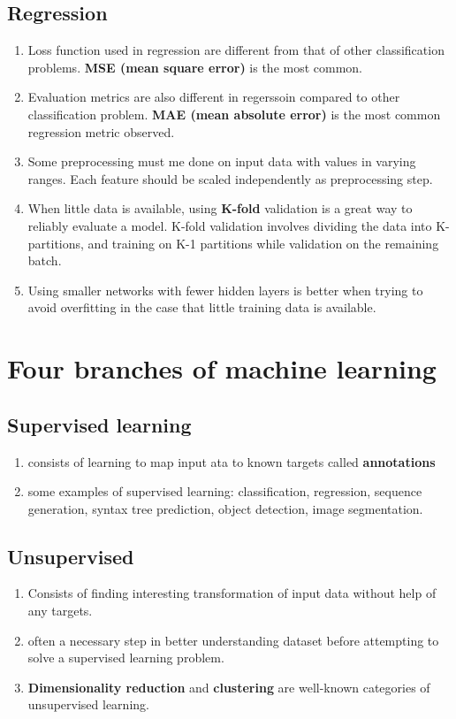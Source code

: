 \documentclass[12pt, a4paper]{article}
\begin{document}
\subsection{Regression}
\begin{enumerate}
   \item Loss function used in regression are different from that of other classification
   problems. \textbf{MSE (mean square error)} is the most common.
   \item Evaluation metrics are also different in regerssoin compared to other
   classification problem. \textbf{MAE (mean absolute error)} is the most common
   regression metric observed.
   \item Some preprocessing must me done on input data with values in varying 
   ranges. Each feature should be scaled independently as preprocessing step.
   \item When little data is available, using \textbf{K-fold} validation is a great
   way to reliably evaluate a model. K-fold validation involves dividing
   the data into K-partitions, and training on K-1 partitions while validation on the 
   remaining batch.
   \item Using smaller networks with fewer hidden layers is better when trying to avoid
   overfitting in the case that little training data is available. 
\end{enumerate}


\section{Four branches of machine learning}

\subsection{Supervised learning}
\begin{enumerate}
   \item consists of learning to map input ata to known targets called
   \textbf{annotations}
   \item some examples of supervised learning: classification,
   regression, sequence generation, syntax tree prediction,
   object detection, image segmentation.
\end{enumerate}

\subsection{Unsupervised}
\begin{enumerate}
   \item Consists of finding interesting transformation of input data without help
   of any targets.
   \item often a necessary step in better understanding dataset before attempting to solve
   a supervised learning problem.
   \item \textbf{Dimensionality reduction} and \textbf{clustering} are well-known categories of
   unsupervised learning.
\end{enumerate}
\end{document}
